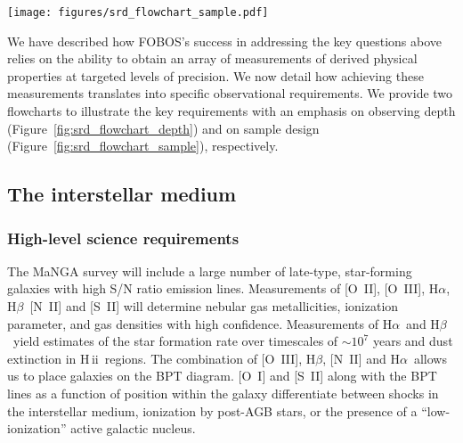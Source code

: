 \documentclass[preprint,11pt]{aastex}
\newcommand{\Halpha}{{H$\alpha$}}
\newcommand{\Hbeta}{{H$\beta$}}
\newcommand{\HII}{{\sc H\,ii}}
\begin{document}
\begin{figure*}
\begin{center}
\texttt{[image: figures/srd\_flowchart\_sample.pdf]}
\caption{Key science requirements flowdown structure. The red boxes above indicate the five categories of science questions we want to address, with the addition of protecting the discovery potential for unforeseen science; the green boxes indicate the high level science requirements; the blue boxes near the bottom indicate the resulting technical requirements on {\it sample selection}. The flowchart only contains the major requirements. The text provides a more complete list of requirements.}
\label{fig:srd_flowchart_sample}
\end{center}
\end{figure*}

We have described how FOBOS's success in addressing the key questions
above relies on the ability to obtain an array of measurements of
derived physical properties at targeted levels of precision.  We now
detail how achieving these measurements translates into specific
observational requirements. We provide two flowcharts
to illustrate the key requirements with an emphasis on observing depth
(Figure~\ref{fig:srd_flowchart_depth}) and on sample design
(Figure~\ref{fig:srd_flowchart_sample}), respectively.

\subsection{The interstellar medium}\label{sec:reqirements_ism}

\subsubsection{High-level science requirements}

The MaNGA survey will include a large number of late-type,
star-forming galaxies with high S/N ratio emission lines.
Measurements of [O~II], [O~III], \Halpha, \Hbeta\, [N~II] and [S~II]
will determine nebular gas metallicities, ionization parameter, and
gas densities with high confidence. Measurements of \Halpha\ and
\Hbeta\ yield estimates of the star formation rate over timescales of
$\sim$$10^7$ years and dust extinction in \HII\ regions.  The
combination of [O~III], \Hbeta, [N~II] and \Halpha\ allows us to place
galaxies on the BPT diagram. [O~I] and [S~II] along with the BPT lines
as a function of position within the galaxy differentiate between
shocks in the interstellar medium, ionization by post-AGB stars, or
the presence of a ``low-ionization'' active galactic nucleus.
\end{document}
